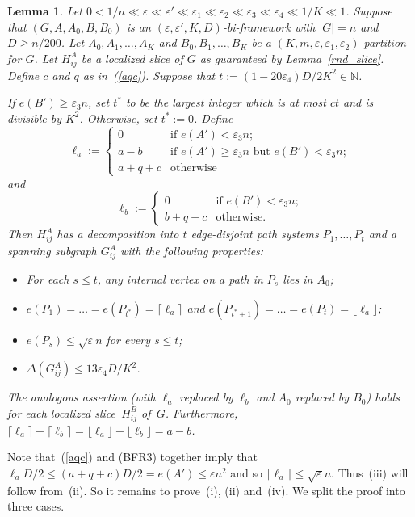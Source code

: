\documentclass{memo-l}
\newtheorem{lemma}[firstthm]{Lemma}
\def\COMMENT#1{}
\def\proof{\removelastskip\penalty55\medskip\noindent{\bf Proof. }}
\def\eps{\varepsilon}
\numberwithin{section}{chapter}
\numberwithin{equation}{section}
\numberwithin{firstthm}{section}
\numberwithin{figure}{section}
\begin{document}
{\begin{lemma} \label{matchingdec}
Let $0<1/n\ll \eps\ll \eps'\ll \eps_1\ll \eps_2\ll \eps_3\ll \eps_4\ll 1/K\ll 1$.
Suppose that $(G,A,A_0,B,B_0)$ is an $(\eps,\eps',K,D)$-bi-framework with $|G|=n$ and $D\ge n/200$.
Let $A_0,A_1,\dots,A_K$ and $B_0,B_1,\dots,B_K$ be a $(K,m,\eps,\eps_1,\eps_2)$-partition for $G$. 
Let $H_{ij}^A$ be a localized slice of $G$ as guaranteed by Lemma~\ref{rnd_slice}.
Define $c$ and $q$ as in~(\ref{aqc}).
Suppose that $t:=(1-20\eps_4)D/2K^2\in \mathbb{N}$.%
   \COMMENT{Later one we will also require that $t$ is divisible by $K^2$.}
If $e(B')\geq \eps _3 n$, set $t^*$ to be the largest integer which is at most $ct$ and is divisible by $K^2$. 
Otherwise, set $t^*:=0$.
Define
$$
\ell _a :=
\left\{
	\begin{array}{ll}
		0 & \mbox{if } e(A') < \eps _3 n ;\\
        a-b & \mbox{if } e(A') \geq \eps _3 n \mbox{ but } e(B') < \eps_ 3 n;\\
		a+q+c & \mbox{otherwise}  
	\end{array}
\right.
$$
and 
$$
\ell _b :=
\left\{
	\begin{array}{ll}
		0 & \mbox{if } e(B') < \eps _3 n ;\\
		b+q+c & \mbox{otherwise.}  
	\end{array}
\right.
$$
Then 
$H_{ij}^A$ has a decomposition into $t$ edge-disjoint path systems $P_1,\dots,P_{t}$ and a spanning subgraph $G_{ij}^A$
with the following properties:
\begin{itemize}
\item[{\rm (i)}] For each $s \leq t$, any internal vertex on a path in $P_s$ lies in $A_0$;
\item[{\rm (ii)}] $e(P_1)=\dots = e(P_{t^*}) =\lceil \ell_a \rceil$ and $e(P_{t^*+1}) = \dots =e(P_{t})= \lfloor \ell_a \rfloor$; 
\item[{\rm (iii)}] $e(P_s)\le \sqrt{\eps} n$ for every $s\le t$;
\item[{\rm (iv)}] $\Delta(G_{ij}^A)\le 13\eps_4 D/K^2$. %
\end{itemize}
The analogous assertion (with $\ell_a$ replaced by $\ell_b$ and $A_0$ replaced by $B_0$) holds for each localized slice~$H_{ij}^B$ of~$G$.
Furthermore, $\lceil \ell _a \rceil -\lceil \ell _b \rceil= \lfloor \ell _a \rfloor -\lfloor \ell _b \rfloor =a-b$.
\end{lemma}
\proof Note that~(\ref{aqc}) and  (BFR3) together imply that $\ell_a D/2\leq (a+q+c)D/2= e(A') \le \eps n^2$ and so
$\lceil \ell_a\rceil \le \sqrt{\eps} n$. Thus~(iii) will follow from~(ii). So it remains to prove~(i), (ii) and~(iv). We split the proof into three cases.

}
\end{document}

